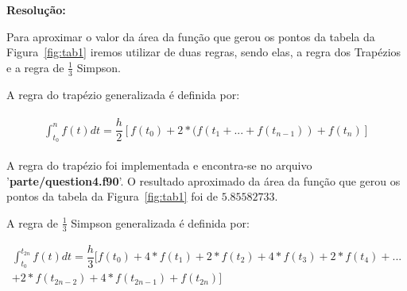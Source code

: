 \documentclass[12pt]{article}
\begin{document}
\textbf{Resolução:}

Para aproximar o valor da área da função que gerou os pontos da tabela da Figura~\ref{fig:tab1} iremos utilizar de duas regras, sendo elas, a regra dos Trapézios e a regra de $\frac{1}{3}$ Simpson.

A regra do trapézio generalizada é definida por:

\begin{eqnarray}
\begin{split}
\int_{t_{0}}^{n} f(t)dt = \dfrac{h}{2}[f(t_{0}) + 2*(f(t_{1} + ... + f(t_{n-1})) + f(t_{n})]
\end{split}
\end{eqnarray}

A regra do trapézio foi implementada e encontra-se no arquivo '\textbf{parte/question4.f90}'. O resultado aproximado da área da função que gerou os pontos da tabela da Figura~\ref{fig:tab1} foi de $5.85582733$. 

A regra de $\frac{1}{3}$ Simpson generalizada é definida por:

\begin{gather*}
\int_{t_{0}}^{t_{2n}} f(t)dt = \dfrac{h}{3} [ f(t_{0}) + 4*f(t_{1}) + 2*f(t_{2}) + 4*f(t_{3}) + 2*f(t_{4}) + ...\\ + 2*f(t_{2n-2}) + 4*f(t_{2n-1}) + f(t_{2n}) ]
\end{gather*}
\end{document}
